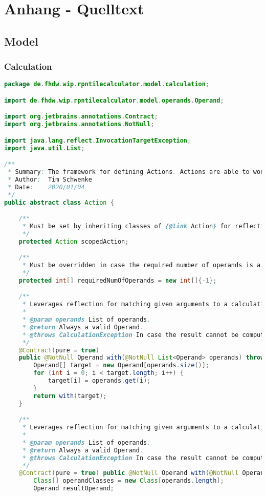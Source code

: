 
\section{Anhang - Quelltext}

\subsection{Model}

\subsubsection{Calculation}

\begin{lstlisting}[caption=Action (Schwenke),label=list:Action,language=Java]
package de.fhdw.wip.rpntilecalculator.model.calculation;

import de.fhdw.wip.rpntilecalculator.model.operands.Operand;

import org.jetbrains.annotations.Contract;
import org.jetbrains.annotations.NotNull;

import java.lang.reflect.InvocationTargetException;
import java.util.List;

/**
 * Summary: The framework for defining Actions. Actions are able to work with operands from the stack or executor functions.
 * Author:  Tim Schwenke
 * Date:    2020/01/04
 */
public abstract class Action {

    /**
     * Must be set by inheriting classes of {@link Action} for reflection to work.
     */
    protected Action scopedAction;

    /**
     * Must be overridden in case the required number of operands is a fixed amount.
     */
    protected int[] requiredNumOfOperands = new int[]{-1};

    /**
     * Leverages reflection for matching given arguments to a calculation method.
     *
     * @param operands List of operands.
     * @return Always a valid Operand.
     * @throws CalculationException In case the result cannot be computed.
     */
    @Contract(pure = true)
    public @NotNull Operand with(@NotNull List<Operand> operands) throws CalculationException {
        Operand[] target = new Operand[operands.size()];
        for (int i = 0; i < target.length; i++) {
            target[i] = operands.get(i);
        }
        return with(target);
    }

    /**
     * Leverages reflection for matching given arguments to a calculation method.
     *
     * @param operands List of operands.
     * @return Always a valid Operand.
     * @throws CalculationException In case the result cannot be computed.
     */
    @Contract(pure = true) public @NotNull Operand with(@NotNull Operand... operands) throws CalculationException {
        Class[] operandClasses = new Class[operands.length];
        Operand resultOperand;


\end{lstlisting}

